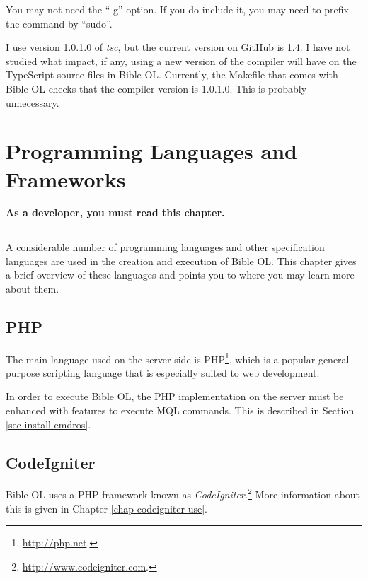 \documentclass[11pt,oneside,a4paper]{memoir}
\begin{document}
You may not need the ``-g'' option. If you do include it, you may need to prefix the command by
``sudo''.
 
I use version 1.0.1.0 of \emph{tsc}, but the current version on GitHub is 1.4. I have not studied
what impact, if any, using a new version of the compiler will have on the TypeScript source files in
Bible OL. Currently, the Makefile that comes with Bible OL checks that the compiler version is
1.0.1.0. This is probably unnecessary.



\chapter{Programming Languages and Frameworks}\label{chap-proglang}

\textbf{As a developer, you must read this chapter.}
\plainbreak{3}

A considerable number of programming languages and other specification languages are used in the
creation and execution of Bible OL. This chapter gives a brief overview of these languages and
points you to where you may learn more about them.


\section{PHP}

The main language used on the server side is PHP\footnote{\url{http://php.net}.}, which is a popular
general-purpose scripting language that is especially suited to web development.

In order to execute Bible OL, the PHP implementation on the server must be enhanced with features to
execute MQL commands. This is described in Section \ref{sec-install-emdros}.

\section{CodeIgniter}\label{sec-codeigniter}

Bible OL uses a PHP framework known as \emph{CodeIgniter.}\footnote{\url{http://www.codeigniter.com}.}
More information about this is given in Chapter \ref{chap-codeigniter-use}.
\end{document}
